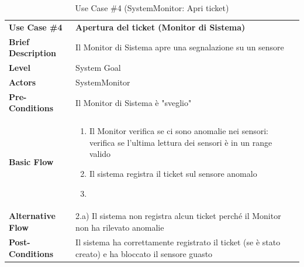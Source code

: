\documentclass[a4paper, 11pt]{article}
\begin{document}
	\begin{table}[h]
		\centering
		\setlength{\arrayrulewidth}{0.8pt} %

		\begin{tabular}{|l p{12cm}|}
			\hline

			\rowcolor{gray!25}
			\textbf{Use Case \#4} & \textbf{Apertura del ticket (Monitor di Sistema)} \\
			\textbf{Brief Description} & Il Monitor di Sistema apre una segnalazione su un sensore \\
			\textbf{Level} & System Goal\\
			\textbf{Actors} & SystemMonitor \\
			\textbf{Pre-Conditions} & Il Monitor di Sistema è "sveglio" \\
			\textbf{Basic Flow} & \begin{enumerate}[label=\arabic*), leftmargin=*, before=\vspace{-0.7cm}, after=\vspace{-0.4cm}]
									  \item Il Monitor verifica se ci sono anomalie nei sensori: verifica se l'ultima lettura dei sensori è in un range valido
									  \item Il sistema registra il ticket sul sensore anomalo
									  \item[]
			\end{enumerate} \\
			\textbf{Alternative Flow} & 2.a) Il sistema non registra alcun ticket perché il Monitor non ha rilevato anomalie \\
			\textbf{Post-Conditions} & Il sistema ha correttamente registrato il ticket (se è stato creato) e ha bloccato il sensore guasto\\

			\hline
		\end{tabular}

		\vspace{0.2cm}
		\caption{Use Case \#4 (SystemMonitor: Apri ticket)}
	\end{table}
	\vspace{1cm}
\end{document}
